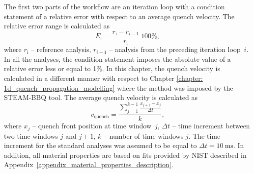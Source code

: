 The first two parts of the workflow are an iteration loop with a condition statement of a relative error with respect to an average quench velocity. The relative error range is calculated as 
\begin{equation}
    E_\text{r} = \frac{r_\text{i}-r_{i-1}}{r_\text{i}}~100\%,
\end{equation}
where $r_\text{i}$ -- reference analysis, $r_{i-1}$ -- analysis from the preceding iteration loop~$i$. In all the analyses, the condition statement imposes the absolute value of a relative error less or equal to 1\%. In this chapter, the quench velocity is calculated in a different manner with respect to Chapter \ref{chapter: 1d_quench_propagation_modelling} where the method was imposed by the STEAM-BBQ tool. The average quench velocity is calculated as
\begin{equation}
    v_\text{quench} = \frac{ \sum_{j=1}^{k-1} \frac{x_{j+1}-x_j}{\Delta t} }{k},
\end{equation}
where $x_j$ -- quench front position at time window~$j$, $\Delta t$ -- time increment between two time windows $j$ and $j+1$, $k$ -- number of time windows $j$. The time increment for the standard analyses was assumed to be equal to $\Delta t=10~\text{ms}$. In addition, all material properties are based on fits provided by NIST described in Appendix~\ref{appendix_material_properties_description}.

